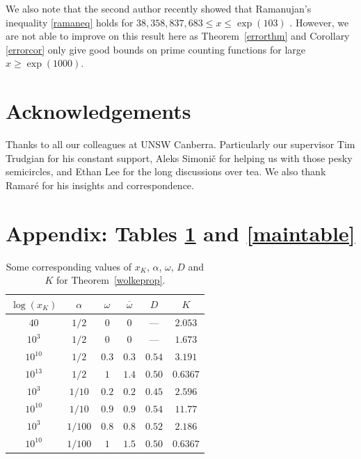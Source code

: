 \documentclass[reqno]{amsart}
\numberwithin{equation}{section}
\theoremstyle{remark}
\begin{document}
We also note that the second author recently showed that Ramanujan's inequality \eqref{ramaneq} holds for $38,358,837,683\leq x\leq\exp(103)$ \cite[Theorem 5.1]{johnston2022improving}. However, we are not able to improve on this result here as Theorem~\ref{errorthm} and Corollary \ref{errorcor} only give good bounds on prime counting functions for large $x\geq\exp(1000)$.

\section*{Acknowledgements}
Thanks to all our colleagues at UNSW Canberra. Particularly our supervisor Tim Trudgian for his constant support, Aleks Simoni\v{c} for helping us with those pesky semicircles, and Ethan Lee for the long discussions over tea. We also thank Ramar{\'e} for his insights and correspondence.

\newpage
\section*{Appendix: Tables \ref{theorem2table1} and \ref{maintable}}
\def\arraystretch{1.5}
\begin{table}[h]
\centering
\caption{Some corresponding values of $x_K$, $\alpha$, $\omega$, $D$ and $K$ for Theorem~\ref{wolkeprop}.}

\begin{tabular}{|c|c|c|c|c|c|}
\hline
$\log(x_K)$ & $\alpha$ & $\omega$ & $\overline{\omega}$ & $D$ & $K$\\
\hline
$40$ & $1/2$ & $0$ & $0$ & --- & $2.053$\\
\hline
$10^3$ & $1/2$ & $0$ & $0$ & --- & $1.673$\\
\hline
$10^{10}$ & $1/2$ & $0.3$ & $0.3$ & $0.54$ & $3.191$\\
\hline
$10^{13}$ & $1/2$ & $1$ & $1.4$ & $0.50$ & $0.6367$\\
\hline
$10^3$ & $1/10$ & $0.2$ & $0.2$ & $0.45$ & $2.596$\\
\hline
$10^{10}$ & $1/10$ & $0.9$ & $0.9$ & $0.54$ & $11.77$\\
\hline
$10^3$ & $1/100$ & $0.8$ & $0.8$ & $0.52$ & $2.186$\\
\hline
$10^{10}$ & $1/100$ & $1$ & $1.5$ & $0.50$ & $0.6367$\\
\hline
\end{tabular}
\label{theorem2table1}
\end{table}
\end{document}
